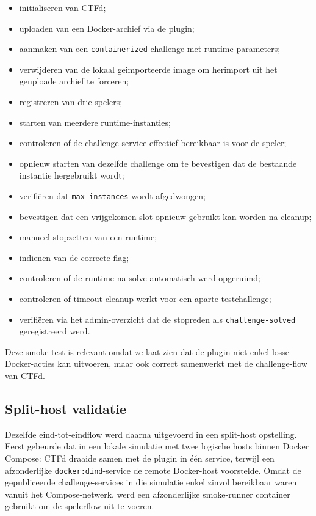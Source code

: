 \begin{itemize}
  \item initialiseren van CTFd;
  \item uploaden van een Docker-archief via de plugin;
  \item aanmaken van een \texttt{containerized} challenge met runtime-parameters;
  \item verwijderen van de lokaal geimporteerde image om herimport uit het geuploade archief te forceren;
  \item registreren van drie spelers;
  \item starten van meerdere runtime-instanties;
  \item controleren of de challenge-service effectief bereikbaar is voor de speler;
  \item opnieuw starten van dezelfde challenge om te bevestigen dat de bestaande instantie hergebruikt wordt;
  \item verifi\"eren dat \texttt{max\_instances} wordt afgedwongen;
  \item bevestigen dat een vrijgekomen slot opnieuw gebruikt kan worden na cleanup;
  \item manueel stopzetten van een runtime;
  \item indienen van de correcte flag;
  \item controleren of de runtime na solve automatisch werd opgeruimd;
  \item controleren of timeout cleanup werkt voor een aparte testchallenge;
  \item verifi\"eren via het admin-overzicht dat de stopreden als \texttt{challenge-solved} geregistreerd werd.
\end{itemize}

Deze smoke test is relevant omdat ze laat zien dat de plugin niet enkel losse Docker-acties kan uitvoeren, maar ook correct samenwerkt met de challenge-flow van CTFd.

\subsection{Split-host validatie}

Dezelfde eind-tot-eindflow werd daarna uitgevoerd in een split-host opstelling. Eerst gebeurde dat in een lokale simulatie met twee logische hosts binnen Docker Compose: CTFd draaide samen met de plugin in één service, terwijl een afzonderlijke \texttt{docker:dind}-service de remote Docker-host voorstelde. Omdat de gepubliceerde challenge-services in die simulatie enkel zinvol bereikbaar waren vanuit het Compose-netwerk, werd een afzonderlijke smoke-runner container gebruikt om de spelerflow uit te voeren.

